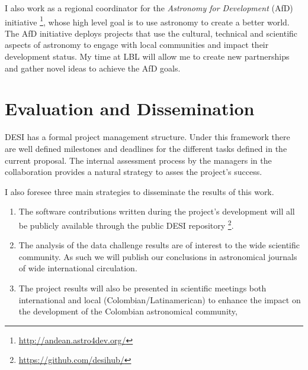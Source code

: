 \documentclass[12pt]{article}
\begin{document}


I also work as a regional coordinator for the \emph{Astronomy for
Development} (AfD)
initiative \footnote{\url{http://andean.astro4dev.org/}}, whose high
level goal is to use astronomy to create a better world.
The AfD initiative deploys projects that use the cultural, technical
and scientific aspects of astronomy to engage with local communities
and impact their development status.  My time at LBL will allow me to
create new partnerships and gather novel ideas to achieve the AfD goals.



\section*{Evaluation and Dissemination}


DESI has a formal project management structure. 
Under this framework there are well defined milestones
and deadlines for the different tasks defined in the current
proposal. The internal assessment process by the managers in the
collaboration provides a natural strategy to asses the project's success.  

\noindent
I also foresee three main strategies to disseminate the results of this
work.
\begin{enumerate}
\item The software contributions written during the project's
development will all be publicly available through the public DESI
repository \footnote{\url{https://github.com/desihub/}}.  


\item The analysis of the data challenge results are of interest to
the wide scientific community. As such we will publish our conclusions
in astronomical journals of wide international circulation. 

\item The project results will also be presented in scientific
meetings both international and local (Colombian/Latinamerican) 
to enhance the impact on the development of the Colombian astronomical
community,  
\end{enumerate}
\end{document}
